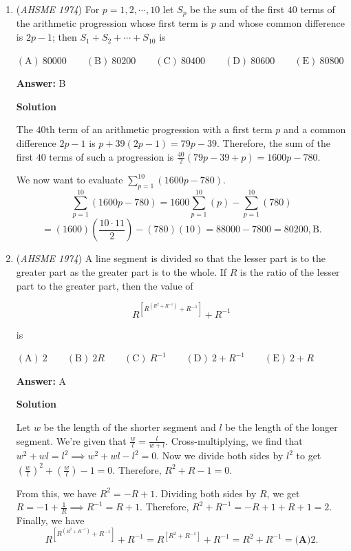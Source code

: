 \begin{enumerate}
 Thus, we must have $0\le x<1/3$ or $2/3\le x<1$, $\boxed{\text{D}}$.

 


	\item (\textit{AHSME 1974}) For $p=1, 2, \cdots, 10$ let $S_p$ be the sum of the first $40$ terms of the arithmetic progression whose first term is $p$ and whose common difference is $2p-1$; then $S_1+S_2+\cdots+S_{10}$ is


 $\mathrm{(A)\ } 80000 \qquad \mathrm{(B) \ }80200 \qquad \mathrm{(C) \  } 80400 \qquad \mathrm{(D) \  } 80600 \qquad \mathrm{(E) \  }80800$

 \textbf{Answer: }B



\textbf{Solution}

The $40\text{th}$ term of an arithmetic progression with a first term $p$ and a common difference $2p-1$ is $p+39(2p-1)=79p-39$. Therefore, the sum of the first $40$ terms of such a progression is $\frac{40}{2}(79p-39+p)=1600p-780$.

 We now want to evaluate $\sum_{p=1}^{10}(1600p-780)$. 
 \[\sum_{p=1}^{10}(1600p-780)=1600\sum_{p=1}^{10}(p)-\sum_{p=1}^{10}(780)\] 
 \[=(1600)\left(\frac{10\cdot11}{2}\right)-(780)(10)=88000-7800=80200, \boxed{\text{B}}.\]



	\item (\textit{AHSME 1974}) A line segment is divided so that the lesser part is to the greater part as the greater part is to the whole. If $R$ is the ratio of the lesser part to the greater part, then the value of 


 
 \[R^{[R^{(R^2+R^{-1})}+R^{-1}]}+R^{-1}\]


 is


 $\mathrm{(A)\ } 2 \qquad \mathrm{(B) \ }2R \qquad \mathrm{(C) \  } R^{-1} \qquad \mathrm{(D) \  } 2+R^{-1} \qquad \mathrm{(E) \  }2+R$

 \textbf{Answer: }A



\textbf{Solution}

Let $w$ be the length of the shorter segment and $l$ be the length of the longer segment. We're given that $\frac{w}{l}=\frac{l}{w+l}$. Cross-multiplying, we find that $w^2+wl=l^2\implies w^2+wl-l^2=0$. Now we divide both sides by $l^2$ to get $\left(\frac{w}{l}\right)^2+\left(\frac{w}{l}\right)-1=0$. Therefore, $R^2+R-1=0$.

 From this, we have $R^2=-R+1$. Dividing both sides by $R$, we get $R=-1+\frac{1}{R}\implies R^{-1}=R+1$. Therefore, $R^2+R^{-1}=-R+1+R+1=2$. Finally, we have 
 \[R^{[R^{(R^2+R^{-1})}+R^{-1}]}+R^{-1}=R^{[R^2+R^{-1}]}+R^{-1}=R^2+R^{-1}= \boxed{\textbf{(A)}2}.\]



\end{enumerate}